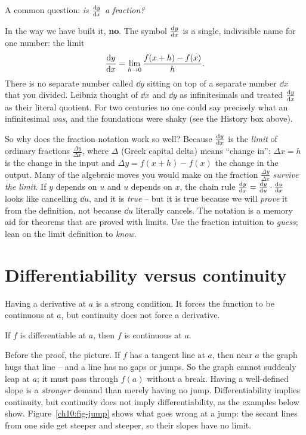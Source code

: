 \begin{happeningbox}
A common question: \emph{is $\frac{\mathrm{d} y}{\mathrm{d} x}$ a fraction?}

In the way we have built it, \textbf{no}. The symbol $\frac{\mathrm{d} y}{\mathrm{d} x}$ is a single,
indivisible name for one number: the limit
\[
  \frac{\mathrm{d} y}{\mathrm{d} x} = \lim_{h\to 0}\frac{f(x+h) - f(x)}{h}.
\]
There is no separate number called $\dd y$ sitting on top of a separate
number $\dd x$ that you divided. Leibniz thought of $\dd x$ and $\dd y$ as
infinitesimals and treated $\frac{\mathrm{d} y}{\mathrm{d} x}$ as their literal quotient. For two
centuries no one could say precisely what an infinitesimal \emph{was}, and the
foundations were shaky (see the History box above).

So why does the fraction notation work so well? Because $\frac{\mathrm{d} y}{\mathrm{d} x}$ is the
\emph{limit} of ordinary fractions $\frac{\Delta y}{\Delta x}$, where $\Delta$
(Greek capital delta) means ``change in'': $\Delta x = h$ is the change in the
input and $\Delta y = f(x+h)-f(x)$ the change in the output. Many of the
algebraic moves you would make on the fraction $\frac{\Delta
y}{\Delta x}$ \emph{survive the limit}. If $y$ depends on $u$ and $u$ depends on
$x$, the chain rule $\frac{\mathrm{d} y}{\mathrm{d} x} = \frac{\mathrm{d} y}{\mathrm{d} u}\cdot
\frac{\mathrm{d} u}{\mathrm{d} x}$ looks like cancelling $\dd u$, and it is \emph{true} -- but it is true
because we will \emph{prove} it from the definition, not because $\dd u$ literally
cancels. The notation is a memory aid for theorems that are proved with limits.
Use the fraction intuition to \emph{guess}; lean on the
limit definition to \emph{know}.
\end{happeningbox}

\section{Differentiability versus continuity}
\label{ch10:diff-vs-cont}

Having a derivative at $a$ is a strong condition. It forces the function to be
continuous at $a$, but continuity does not force a derivative.

\begin{theorem}
\label{ch10:thm-diff-implies-cont}
If $f$ is differentiable at $a$, then $f$ is continuous at $a$.
\end{theorem}

\begin{intuitionbox}
Before the proof, the picture. If $f$ has a tangent line at $a$, then near $a$ the
graph hugs that line -- and a line has no gaps or jumps. So the graph cannot
suddenly leap at $a$; it must pass through $f(a)$ without a break. Having a well-defined
slope is a \emph{stronger} demand than merely having no jump. Differentiability
implies continuity, but continuity does not imply
differentiability, as the examples below show.
Figure~\ref{ch10:fig-jump} shows what goes wrong at a jump: the secant lines
from one side get steeper and steeper, so their slopes have no limit.
\end{intuitionbox}

